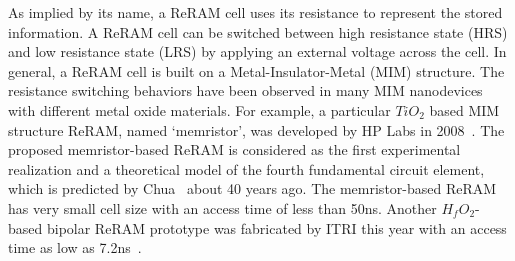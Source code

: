
As implied by its name, a ReRAM cell uses its resistance to represent the
stored information. A ReRAM cell can be switched between high resistance
state (HRS) and low resistance state (LRS) by applying an external voltage
across the cell.
In general, a ReRAM cell is built on a Metal-Insulator-Metal (MIM)
structure. The resistance switching behaviors have been observed in many
MIM nanodevices with different metal oxide materials. For example, a
particular $TiO_2$ based MIM structure ReRAM, named `memristor', was
developed by HP Labs in 2008~\cite{memristor:missing}. The proposed
memristor-based ReRAM is considered as the first experimental realization
and a theoretical model of the fourth fundamental circuit element, which
is predicted by Chua~\cite{memristor:chua} about 40 years ago. The
memristor-based ReRAM has very small cell size with an access time of less
than 50ns.
Another $H_fO_2$-based bipolar ReRAM prototype was fabricated by ITRI this year
with an access time as low as 7.2ns~\cite{ReRAM_ISSCC2011_Sheu}.

